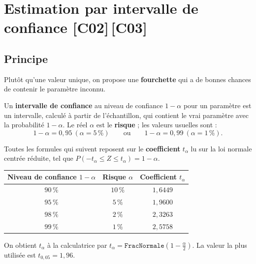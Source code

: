 \documentclass[a4paper,11pt]{article}
\begin{document}
\newpage
\section{Estimation par intervalle de confiance \hfill {\normalsize\color{uimmred}[C02]\,[C03]}}

\subsection{Principe}

Plutôt qu'une valeur unique, on propose une \textbf{fourchette} qui a de bonnes chances de contenir le paramètre inconnu.

\begin{definition}
Un \textbf{intervalle de confiance} au niveau de confiance $1-\alpha$ pour un paramètre est un intervalle, calculé à partir de l'échantillon, qui contient le vrai paramètre avec la probabilité $1-\alpha$. Le réel $\alpha$ est le \textbf{risque} ; les valeurs usuelles sont :
\[
1-\alpha = 0{,}95 \ (\alpha = 5\,\%) \qquad\text{ou}\qquad 1-\alpha = 0{,}99 \ (\alpha = 1\,\%).
\]
\end{definition}

Toutes les formules qui suivent reposent sur le \textbf{coefficient} $t_\alpha$ lu sur la loi normale centrée réduite, tel que $P(-t_\alpha \leq Z \leq t_\alpha) = 1-\alpha$.

\begin{theoreme}
\renewcommand{\arraystretch}{1.3}
\begin{center}
\begin{tabular}{@{}c c c@{}}
\toprule
\textbf{Niveau de confiance $1-\alpha$} & \textbf{Risque $\alpha$} & \textbf{Coefficient $t_\alpha$} \\
\midrule
$90\,\%$ & $10\,\%$ & $1{,}6449$ \\
$95\,\%$ & $5\,\%$  & $1{,}9600$ \\
$98\,\%$ & $2\,\%$  & $2{,}3263$ \\
$99\,\%$ & $1\,\%$  & $2{,}5758$ \\
\bottomrule
\end{tabular}
\end{center}
On obtient $t_\alpha$ à la calculatrice par $t_\alpha = \texttt{FracNormale}\!\left(1 - \frac{\alpha}{2}\right)$. La valeur la plus utilisée est $t_{0{,}05} = 1{,}96$.
\end{theoreme}
\end{document}
